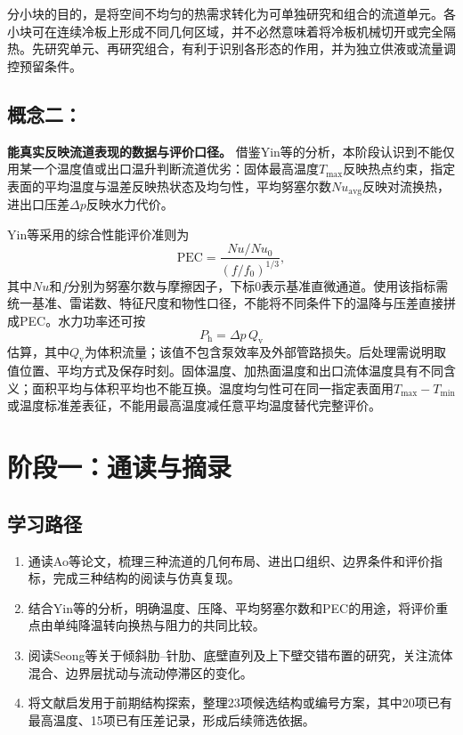 \documentclass[stage1,fontset=fandol]{ydzjreport}
\begin{document}
分小块的目的，是将空间不均匀的热需求转化为可单独研究和组合的流道单元。各小块可在连续冷板上形成不同几何区域，并不必然意味着将冷板机械切开或完全隔热。先研究单元、再研究组合，有利于识别各形态的作用，并为独立供液或流量调控预留条件。

\subsection{概念二：}
\textbf{能真实反映流道表现的数据与评价口径。} 借鉴Yin等的分析\cite{yin}，本阶段认识到不能仅用某一个温度值或出口温升判断流道优劣：固体最高温度$T_{\max}$反映热点约束，指定表面的平均温度与温差反映热状态及均匀性，平均努塞尔数$Nu_{\mathrm{avg}}$反映对流换热，进出口压差$\Delta p$反映水力代价。

Yin等采用的综合性能评价准则为
\[
 \mathrm{PEC}=\frac{Nu/Nu_0}{(f/f_0)^{1/3}},
\]
其中$Nu$和$f$分别为努塞尔数与摩擦因子，下标0表示基准直微通道。使用该指标需统一基准、雷诺数、特征尺度和物性口径，不能将不同条件下的温降与压差直接拼成PEC。水力功率还可按
\[
 P_{\mathrm h}=\Delta p\,Q_{\mathrm v}
\]
估算，其中$Q_{\mathrm v}$为体积流量；该值不包含泵效率及外部管路损失。后处理需说明取值位置、平均方式及保存时刻。固体温度、加热面温度和出口流体温度具有不同含义；面积平均与体积平均也不能互换。温度均匀性可在同一指定表面用$T_{\max}-T_{\min}$或温度标准差表征，不能用最高温度减任意平均温度替代完整评价。

\section{阶段一：通读与摘录}
\subsection{学习路径}
\begin{enumerate}
\item 通读Ao等论文，梳理三种流道的几何布局、进出口组织、边界条件和评价指标，完成三种结构的阅读与仿真复现。
\item 结合Yin等的分析，明确温度、压降、平均努塞尔数和PEC的用途，将评价重点由单纯降温转向换热与阻力的共同比较。
\item 阅读Seong等关于倾斜肋--针肋、底壁直列及上下壁交错布置的研究，关注流体混合、边界层扰动与流动停滞区的变化。
\item 将文献启发用于前期结构探索，整理23项候选结构或编号方案，其中20项已有最高温度、15项已有压差记录，形成后续筛选依据。
\end{enumerate}
\end{document}
